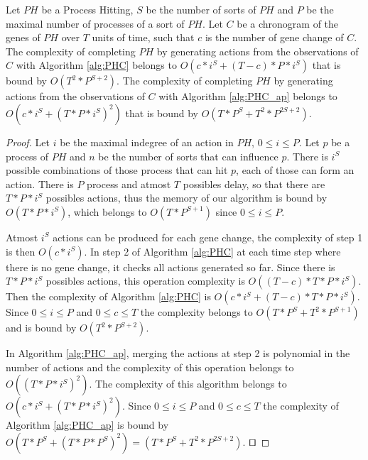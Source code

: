 \begin{theorem}[Complexity]
	\label{th:complexity}
	Let $PH$ be a Process Hitting, $S$ be the number of sorts of $PH$ and $P$ be the maximal number of processes of a sort of $PH$.
	Let $C$ be a chronogram of the genes of $PH$ over $T$ units of time, such that $c$ is the number of gene change of $C$.
	The complexity of completing $PH$ by generating actions from the observations of $C$ with Algorithm \ref{alg:PHC} belongs to $O(c*i^S + (T-c) * P * i^S)$ that is bound by
	$O(T^2*P^{S+2})$.
	The complexity of completing $PH$ by generating actions from the observations of $C$ with Algorithm \ref{alg:PHC_ap} belongs to $O(c*i^S + (T*P*i^S)^2)$ that is bound by
	$O(T*P^S + T^2*P^{2S+2})$.
	\begin{proof}
		Let $i$ be the maximal indegree of an action in $PH$, $0 \leq i \leq P$.
		Let $p$ be a process of $PH$ and $n$ be the number of sorts that can influence $p$.
		There is $i^S$ possible combinations of those process that can hit $p$, each of those can form an action.
		There is $P$ process and atmost $T$ possibles delay, so that there are $T* P * i^S$ possibles actions, thus the memory of our algorithm is bound by $O(T * P * i^S)$,
		which belongs to $O(T*P^{S+1})$ since $0 \leq i \leq P$.
	
		Atmost $i^S$ actions can be produced for each gene change, the complexity of step 1 is then $O(c * i^S)$.
		In step 2 of Algorithm \ref{alg:PHC} at each time step where there is no gene change, it checks all actions generated so far.
		Since there is $T * P * i^S$ possibles actions, this operation complexity is $O( (T-c) * T * P * i^S)$.
		Then the complexity of Algorithm \ref{alg:PHC} is $O(c*i^S + (T-c) * T * P * i^S)$.
		Since $0 \leq i \leq P$ and $0 \leq c \leq T$ the complexity belongs to $O(T*P^S + T^2 * P^{S+1})$ and is bound by $O(T^2*P^{S+2})$.
		
		In Algorithm \ref{alg:PHC_ap},
		merging the actions at step 2 is polynomial in the number of actions and the complexity of this operation belongs to $O((T*P*i^S)^2)$.
		The complexity of this algorithm belongs to $O(c*i^S + (T*P*i^S)^2)$.
		Since $0 \leq i \leq P$ and $0 \leq c \leq T$ the complexity of Algorithm \ref{alg:PHC_ap} is bound by $O(T*P^S + (T*P*P^S)^2) = (T*P^S + T^2*P^{2S+2})$.
		$\qed$
	\end{proof}
\end{theorem}




